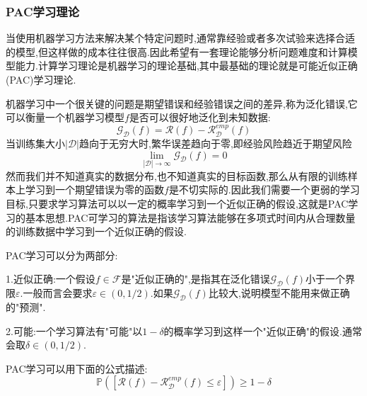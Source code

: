 \subsubsection{PAC学习理论}
当使用机器学习方法来解决某个特定问题时,通常靠经验或者多次试验来选择合适的模型,但这样做的成本往往很高.因此希望有一套理论能够分析问题难度和计算模型能力.计算学习理论是机器学习的理论基础,其中最基础的理论就是可能近似正确(PAC)学习理论.\par
机器学习中一个很关键的问题是期望错误和经验错误之间的差异,称为泛化错误,它可以衡量一个机器学习模型$f$是否可以很好地泛化到未知数据:
$$
\mathcal{G}_{\mathcal{D}}(f)=\mathcal{R}(f)-\mathcal{R}^{emp}_{\mathcal{D}}(f)
$$
当训练集大小$|\mathcal{D}|$趋向于无穷大时,繁华误差趋向于零,即经验风险趋近于期望风险
$$
\lim\limits_{|\mathcal{D}|\rightarrow\infty}\mathcal{G}_{\mathcal{D}}(f)=0
$$
然而我们并不知道真实的数据分布,也不知道真实的目标函数,那么从有限的训练样本上学习到一个期望错误为零的函数$f$是不切实际的.因此我们需要一个更弱的学习目标,只要求学习算法可以以一定的概率学习到一个近似正确的假设,这就是PAC学习的基本思想.PAC可学习的算法是指该学习算法能够在多项式时间内从合理数量的训练数据中学习到一个近似正确的假设.\par
PAC学习可以分为两部分:\par
1.近似正确:一个假设$f\in\mathcal{F}$是"近似正确的",是指其在泛化错误$\mathcal{G}_{\mathcal{D}}(f)$小于一个界限$\varepsilon$.一般而言会要求$\varepsilon\in (0,1/2)$.如果$\mathcal{G}_{\mathcal{D}}(f)$比较大,说明模型不能用来做正确的"预测".\par
2.可能:一个学习算法有"可能"以$1-\delta$的概率学习到这样一个"近似正确"的假设.通常会取$\delta\in (0,1/2)$.\par
PAC学习可以用下面的公式描述:
$$
\mathbb{P}\left([\mathcal{R}(f)-\mathcal{R}^{emp}_{\mathcal{D}}(f)\leqslant\varepsilon]\right)\geqslant 1-\delta
$$
